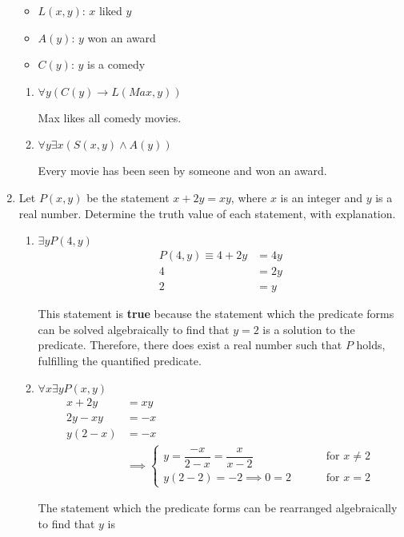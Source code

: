 \documentclass[letterpaper, 12pt]{article}
\newcommand{\keyword}[1]{\textbf{#1}}
\newcommand{\then}{\rightarrow}
\begin{document}
\begin{enumerate}
\begin{itemize}
\item $L(x, y)$: $x$ liked $y$
\item $A(y)$: $y$ won an award
\item $C(y)$: $y$ is a comedy
\end{itemize}
\begin{enumerate}
\item $\forall y (C(y) \then L(Max, y))$
\begin{flushleft}
    Max likes all comedy movies.
\end{flushleft}
\item $\forall y \exists x (S(x, y) \wedge A(y))$
\begin{flushleft}
    Every movie has been seen by someone and won an award.
\end{flushleft}
\end{enumerate}
\item Let $P(x, y)$ be the statement $x + 2y = xy$, where $x$ is an integer and $y$ is a real 
number. Determine the truth value of each statement, with explanation.
\begin{enumerate}
\item $\exists y P(4, y)$
\begin{align*}
    P(4, y) \equiv 4 + 2y &= 4y \\
    4 &= 2y \\
    2 &= y
\end{align*}
\begin{flushleft}
    This statement is \keyword{true} because the statement which the predicate forms can be 
    solved algebraically to find that $y = 2$ is a solution to the predicate. Therefore, there 
    does exist a real number such that $P$ holds, fulfilling the quantified predicate.
\end{flushleft}
\item $\forall x \exists y P(x, y)$
\begin{align*}
    x + 2y &= xy \\
    2y - xy &= -x \\
    y(2 - x) &= -x \\
    &\implies \begin{cases}
        y = \dfrac{-x}{2 - x} = \dfrac{x}{x - 2} &\qquad \text{ for } x \ne 2 \\
        y(2 - 2) = -2 \implies 0 = 2 &\qquad \text{ for } x = 2
    \end{cases}
\end{align*}
\begin{flushleft}
    The statement which the predicate forms can be rearranged algebraically to find that $y$ is

\end{flushleft}
\end{enumerate}
\end{enumerate}
\end{document}
